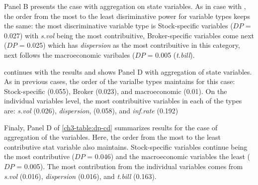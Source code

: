 Panel B presents the case with \diff{} aggregation on state variables. As in case with \raw, the order from the most to the least disriminative power for variable types keeps the same: the most discriminative variable type is Stock-specific variables ($DP$ = 0.027) with \textit{s.vol} being the most contribuitive, Broker-specific variables come next ($DP$ = 0.025) which has \textit{dispersion} as the most contribuitive in this category, next follows the macroeconomic varibales ($DP$ = 0.005 (\textit{t.bill}).

 continues with the results and shows Panel D with \random{} aggregation of state variables. As in previous cases, the order of the varialbe types maintains for this case: Stock-specific (0.055), Broker (0.023), and macroeconomic (0.01). On the individual variables level, the most contribuitive variables in each of the types are: \textit{s.vol} (0.026), \textit{dispersion}, (0.058), and \textit{inf.rate} (0.192)

Finaly, Panel D of \ref{ch3-table:dp-cd} summarizes results for the case of \rollsd{} aggregation of the variables. Here, the order from the most to the least contributive stat variable also maintains. Stock-specific variables continue being the most contributive ($DP$ = 0.046) and the macroeconomic variables the least ($DP$ = 0.005). The most contribution from the individual variables comes from \textit{s.vol} (0.016), \textit{dispersion} (0.016), and \textit{t.bill} (0.163).



